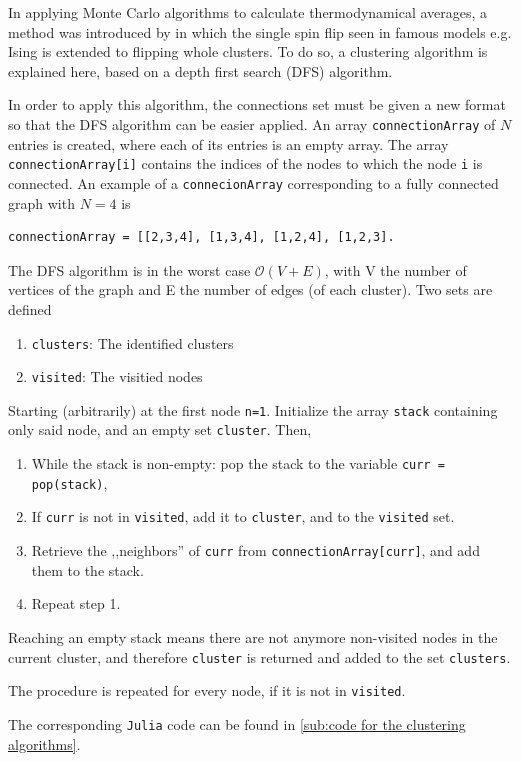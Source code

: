 In applying Monte Carlo algorithms to calculate thermodynamical averages, a method was introduced by \cite{PhysRevLett.58.86} in which the single spin flip seen in famous models e.g. Ising is extended to flipping whole clusters. To do so, a clustering algorithm is explained here, based on a depth first search (DFS) algorithm.

In order to apply this algorithm, the connections set must be given a new format so that the DFS algorithm can be easier applied. An array \texttt{connectionArray} of $N$ entries is created, where each of its entries is an empty array. The array \texttt{connectionArray[i]} contains the indices of the nodes to which the node \texttt{i} is connected. An example of a \texttt{connecionArray} corresponding to a fully connected graph with $N=4$ is
\begin{lstlisting}
connectionArray = [[2,3,4], [1,3,4], [1,2,4], [1,2,3].
\end{lstlisting}

The DFS algorithm is in the worst case $\mathcal{O}(V + E)$, with V the number of vertices of the graph and E the number of edges (of each cluster).  Two sets are defined
\begin{enumerate}
	\item \texttt{clusters}: The identified clusters
	\item \texttt{visited}: The visitied nodes
\end{enumerate}

Starting (arbitrarily) at the first node \texttt{n=1}. Initialize the array \texttt{stack} containing only said node, and an empty set \texttt{cluster}. Then,
\begin{enumerate}
	\item While the stack is non-empty: pop the stack to the variable \texttt{curr = pop(stack)},
	\item  If \texttt{curr} is not in \texttt{visited}, add it to \texttt{cluster}, and to the \texttt{visited} set.
	\item Retrieve the ,,neighbors'' of \texttt{curr} from \texttt{connectionArray[curr]}, and add them to the stack.
	\item Repeat step 1.
\end{enumerate}
Reaching an empty stack means there are not anymore non-visited nodes in the current cluster, and therefore \texttt{cluster} is returned and added to the set \texttt{clusters}.

The procedure is repeated for every node, if it is not in \texttt{visited}.

The corresponding \texttt{Julia} code can be found in \ref{sub:code for the clustering algorithms}.

